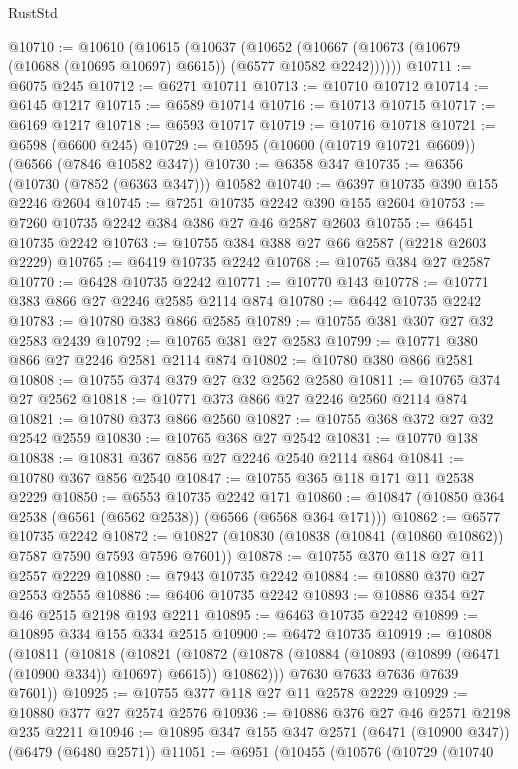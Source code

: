 \begin{lexlean}{RustStd}
\begin{coremodule}
{\begin{coremodule}
{{{{{{{{{{{{{{{{{{{{{{{{{{@10710 := @10610
    (@10615
      (@10637
        (@10652 (@10667 (@10673 (@10679 (@10688 (@10695 @10697) @6615)) (@6577 @10582 @2242))))))
@10711 := @6075 @245
@10712 := @6271 @10711
@10713 := @10710 @10712
@10714 := @6145 @1217
@10715 := @6589 @10714
@10716 := @10713 @10715
@10717 := @6169 @1217
@10718 := @6593 @10717
@10719 := @10716 @10718
@10721 := @6598 (@6600 @245)
@10729 := @10595 (@10600 (@10719 @10721 @6609)) (@6566 (@7846 @10582 @347))
@10730 := @6358 @347
@10735 := @6356 (@10730 (@7852 (@6363 @347))) @10582
@10740 := @6397 @10735 @390 @155 @2246 @2604
@10745 := @7251 @10735 @2242 @390 @155 @2604
@10753 := @7260 @10735 @2242 @384 @386 @27 @46 @2587 @2603
@10755 := @6451 @10735 @2242
@10763 := @10755 @384 @388 @27 @66 @2587 (@2218 @2603 @2229)
@10765 := @6419 @10735 @2242
@10768 := @10765 @384 @27 @2587
@10770 := @6428 @10735 @2242
@10771 := @10770 @143
@10778 := @10771 @383 @866 @27 @2246 @2585 @2114 @874
@10780 := @6442 @10735 @2242
@10783 := @10780 @383 @866 @2585
@10789 := @10755 @381 @307 @27 @32 @2583 @2439
@10792 := @10765 @381 @27 @2583
@10799 := @10771 @380 @866 @27 @2246 @2581 @2114 @874
@10802 := @10780 @380 @866 @2581
@10808 := @10755 @374 @379 @27 @32 @2562 @2580
@10811 := @10765 @374 @27 @2562
@10818 := @10771 @373 @866 @27 @2246 @2560 @2114 @874
@10821 := @10780 @373 @866 @2560
@10827 := @10755 @368 @372 @27 @32 @2542 @2559
@10830 := @10765 @368 @27 @2542
@10831 := @10770 @138
@10838 := @10831 @367 @856 @27 @2246 @2540 @2114 @864
@10841 := @10780 @367 @856 @2540
@10847 := @10755 @365 @118 @171 @11 @2538 @2229
@10850 := @6553 @10735 @2242 @171
@10860 := @10847 (@10850 @364 @2538 (@6561 (@6562 @2538)) (@6566 (@6568 @364 @171)))
@10862 := @6577 @10735 @2242
@10872 := @10827 (@10830 (@10838 (@10841 (@10860 @10862)) @7587 @7590 @7593 @7596 @7601))
@10878 := @10755 @370 @118 @27 @11 @2557 @2229
@10880 := @7943 @10735 @2242
@10884 := @10880 @370 @27 @2553 @2555
@10886 := @6406 @10735 @2242
@10893 := @10886 @354 @27 @46 @2515 @2198 @193 @2211
@10895 := @6463 @10735 @2242
@10899 := @10895 @334 @155 @334 @2515
@10900 := @6472 @10735
@10919 := @10808
    (@10811
      (@10818
        (@10821
          (@10872 (@10878 (@10884 (@10893 (@10899 (@6471 (@10900 @334)) @10697) @6615)) @10862)))
        @7630
        @7633
        @7636
        @7639
        @7601))
@10925 := @10755 @377 @118 @27 @11 @2578 @2229
@10929 := @10880 @377 @27 @2574 @2576
@10936 := @10886 @376 @27 @46 @2571 @2198 @235 @2211
@10946 := @10895 @347 @155 @347 @2571 (@6471 (@10900 @347)) (@6479 (@6480 @2571))
@11051 := @6951
    (@10455
      (@10576
        (@10729
          (@10740
}}}}}}}}}}}}}}}}}}}}}}}}}}
\end{coremodule}}
\end{coremodule}
\end{lexlean}
